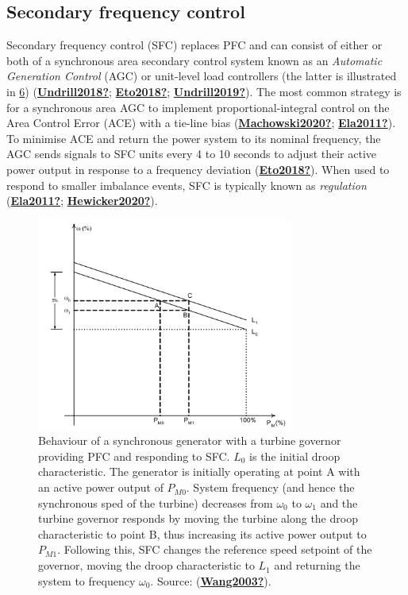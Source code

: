 \documentclass[12pt,a4paper,]{report}
\begin{document}
\hypertarget{secondary-frequency-control}{%
\subsection{Secondary frequency
control}\label{secondary-frequency-control}}

Secondary frequency control (SFC) replaces PFC and can consist of either
or both of a synchronous area secondary control system known as an
\emph{Automatic Generation Control} (AGC) or unit-level load controllers
(the latter is illustrated in \protect\hyperlink{fig:droop}{6})
(\protect\hyperlink{ref-Undrill2018}{\textbf{Undrill2018?}};
\protect\hyperlink{ref-Eto2018}{\textbf{Eto2018?}};
\protect\hyperlink{ref-Undrill2019}{\textbf{Undrill2019?}}). The most
common strategy is for a synchronous area AGC to implement
proportional-integral control on the Area Control Error (ACE) with a
tie-line bias
(\protect\hyperlink{ref-Machowski2020}{\textbf{Machowski2020?}};
\protect\hyperlink{ref-Ela2011}{\textbf{Ela2011?}}). To minimise ACE and
return the power system to its nominal frequency, the AGC sends signals
to SFC units every 4 to 10 seconds to adjust their active power output
in response to a frequency deviation
(\protect\hyperlink{ref-Eto2018}{\textbf{Eto2018?}}). When used to
respond to smaller imbalance events, SFC is typically known as
\emph{regulation} (\protect\hyperlink{ref-Ela2011}{\textbf{Ela2011?}};
\protect\hyperlink{ref-Hewicker2020}{\textbf{Hewicker2020?}}).

\begin{figure}
\hypertarget{fig:droop}{%
\centering
\includegraphics[width=0.75\textwidth,height=\textheight]{source/figures/droop.png}
\caption{Behaviour of a synchronous generator with a turbine governor
providing PFC and responding to SFC. \(L_0\) is the initial droop
characteristic. The generator is initially operating at point A with an
active power output of \(P_{M0}\). System frequency (and hence the
synchronous sped of the turbine) decreases from \(\omega_0\) to
\(\omega_1\) and the turbine governor responds by moving the turbine
along the droop characteristic to point B, thus increasing its active
power output to \(P_{M1}\). Following this, SFC changes the reference
speed setpoint of the governor, moving the droop characteristic to
\(L_1\) and returning the system to frequency \(\omega_0\). Source:
(\protect\hyperlink{ref-Wang2003}{\textbf{Wang2003?}}).}\label{fig:droop}
}
\end{figure}
\end{document}
